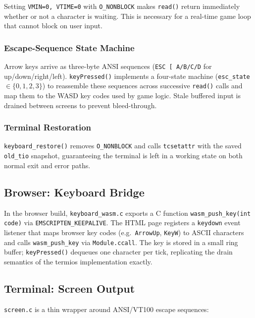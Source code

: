 \documentclass[conference]{IEEEtran}
\begin{document}
Setting \texttt{VMIN=0, VTIME=0} with \texttt{O\_NONBLOCK} makes
\texttt{read()} return immediately whether or not a character is waiting.
This is necessary for a real-time game loop that cannot block on user input.

\subsubsection{Escape-Sequence State Machine}

Arrow keys arrive as three-byte ANSI sequences (\texttt{ESC [ A/B/C/D} for
up/down/right/left). \texttt{keyPressed()} implements a four-state machine
(\texttt{esc\_state} $\in \{0, 1, 2, 3\}$) to reassemble these sequences
across successive \texttt{read()} calls and map them to the WASD key codes
used by game logic. Stale buffered input is drained between screens to
prevent bleed-through.

\subsubsection{Terminal Restoration}

\texttt{keyboard\_restore()} removes \texttt{O\_NONBLOCK} and calls
\texttt{tcsetattr} with the saved \texttt{old\_tio} snapshot, guaranteeing
the terminal is left in a working state on both normal exit and error paths.

\subsection{Browser: Keyboard Bridge}

In the browser build, \texttt{keyboard\_wasm.c} exports a C function
\texttt{wasm\_push\_key(int code)} via \texttt{EMSCRIPTEN\_KEEPALIVE}. The
HTML page registers a \texttt{keydown} event listener that maps browser key
codes (e.g.\ \texttt{ArrowUp}, \texttt{KeyW}) to ASCII characters and calls
\texttt{wasm\_push\_key} via \texttt{Module.ccall}. The key is stored in a
small ring buffer; \texttt{keyPressed()} dequeues one character per tick,
replicating the drain semantics of the termios implementation exactly.

\subsection{Terminal: Screen Output}

\texttt{screen.c} is a thin wrapper around ANSI/VT100 escape sequences:
\end{document}
